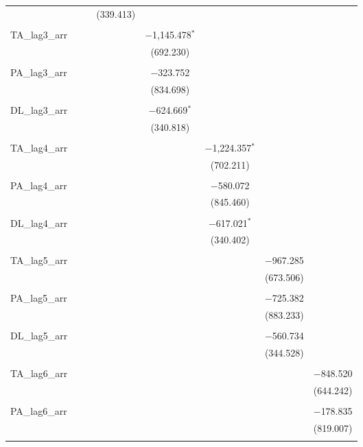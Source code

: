 \begin{table}[!htbp]
\begin{tabular}{@{\extracolsep{5pt}}lccccccc}
  &  &  & (339.413) &  &  &  &  \\ 
  & & & & & & & \\ 
 TA\_lag3\_arr &  &  &  & $-$1,145.478$^{*}$ &  &  &  \\ 
  &  &  &  & (692.230) &  &  &  \\ 
  & & & & & & & \\ 
 PA\_lag3\_arr &  &  &  & $-$323.752 &  &  &  \\ 
  &  &  &  & (834.698) &  &  &  \\ 
  & & & & & & & \\ 
 DL\_lag3\_arr &  &  &  & $-$624.669$^{*}$ &  &  &  \\ 
  &  &  &  & (340.818) &  &  &  \\ 
  & & & & & & & \\ 
 TA\_lag4\_arr &  &  &  &  & $-$1,224.357$^{*}$ &  &  \\ 
  &  &  &  &  & (702.211) &  &  \\ 
  & & & & & & & \\ 
 PA\_lag4\_arr &  &  &  &  & $-$580.072 &  &  \\ 
  &  &  &  &  & (845.460) &  &  \\ 
  & & & & & & & \\ 
 DL\_lag4\_arr &  &  &  &  & $-$617.021$^{*}$ &  &  \\ 
  &  &  &  &  & (340.402) &  &  \\ 
  & & & & & & & \\ 
 TA\_lag5\_arr &  &  &  &  &  & $-$967.285 &  \\ 
  &  &  &  &  &  & (673.506) &  \\ 
  & & & & & & & \\ 
 PA\_lag5\_arr &  &  &  &  &  & $-$725.382 &  \\ 
  &  &  &  &  &  & (883.233) &  \\ 
  & & & & & & & \\ 
 DL\_lag5\_arr &  &  &  &  &  & $-$560.734 &  \\ 
  &  &  &  &  &  & (344.528) &  \\ 
  & & & & & & & \\ 
 TA\_lag6\_arr &  &  &  &  &  &  & $-$848.520 \\ 
  &  &  &  &  &  &  & (644.242) \\ 
  & & & & & & & \\ 
 PA\_lag6\_arr &  &  &  &  &  &  & $-$178.835 \\ 
  &  &  &  &  &  &  & (819.007) \\ 
  & & & & & & & \\ 

\end{tabular}
\end{table}
